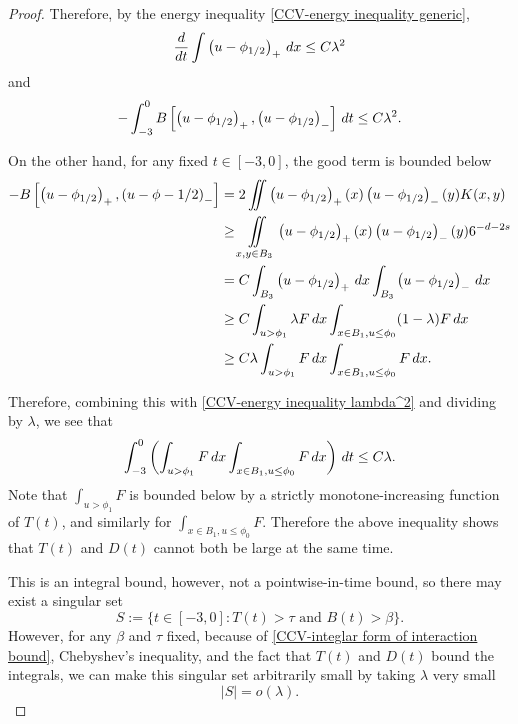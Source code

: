 \begin{proof}
Therefore, by the energy inequality \eqref{CCV-energy inequality generic}, 
\begin{equation} \label{CCV-derivative bound} \frac{d}{dt} \int \left( u-\phi_{1/2} \right)_+ \,dx \leq C \lambda^2 \end{equation}
and
\begin{equation} \label{CCV-energy inequality lambda^2}
- \int_{-3}^0 B\left[ \left( u-\phi_{1/2} \right)_+, \left( u-\phi_{1/2} \right)_- \right] \,dt \leq C \lambda^2.
\end{equation}

On the other hand, for any fixed $t \in [-3,0]$, the good term is bounded below
\begin{align*} 
-B\left[ \left( u-\phi_{1/2} \right)_+, \left( u-\phi-{1/2} \right)_- \right] &= 2 \iint \left( u-\phi_{1/2} \right)_+(x) \left( u-\phi_{1/2} \right)_-(y) K(x,y)
\\ & \geq \iint\limits_{x,y \in B_3} \left( u-\phi_{1/2} \right)_+(x) \left( u-\phi_{1/2} \right)_-(y) 6^{-d-2s}
\\ &= C \int_{B_3} \left( u-\phi_{1/2} \right)_+ \,dx \int_{B_3} \left( u-\phi_{1/2} \right)_- \,dx
\\ &\geq C \int_{u > \phi_1} \lambda F \,dx \int_{x \in B_1, u \leq \phi_0} (1-\lambda) F \,dx
\\ &\geq C \lambda \int_{u > \phi_1} F \,dx \int_{x \in B_1, u \leq \phi_0} F \,dx.
\end{align*}

Therefore, combining this with \eqref{CCV-energy inequality lambda^2} and dividing by $\lambda$, we see that
\begin{equation} \label{CCV-integlar form of interaction bound} \int_{-3}^0 \left(  \int_{u > \phi_1} F \,dx \int_{x \in B_1, u \leq \phi_0} F \,dx  \right)\,dt \leq C \lambda. \end{equation}
Note that $\int_{u > \phi_1} F$ is bounded below by a strictly monotone-increasing function of $T(t)$, and similarly for $\int_{x \in B_1, u \leq \phi_0} F$.  Therefore the above inequality shows that $T(t)$ and $D(t)$ cannot both be large at the same time.  

This is an integral bound, however, not a pointwise-in-time bound, so there may exist a singular set
\[ S := \{ t \in [-3,0]: T(t)>\tau \textrm{ and } B(t)> \beta\}. \]
However, for any $\beta$ and $\tau$ fixed, because of \eqref{CCV-integlar form of interaction bound}, Chebyshev's inequality, and the fact that $T(t)$ and $D(t)$ bound the integrals, we can make this singular set arbitrarily small by taking $\lambda$ very small
\begin{equation} \label{CCV-small measure of overlap} 
|S| = o(\lambda).
\end{equation}



\end{proof}
